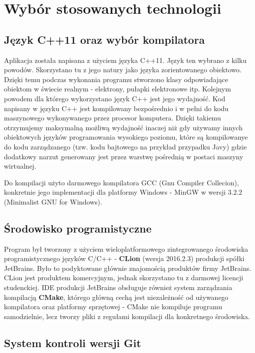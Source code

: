\chapter{Wybór stosowanych technologii}
\section{Język C++11 oraz wybór kompilatora}
Aplikacja została napisana z użyciem języka C++11. Język ten
wybrano z kilku powodów. Skorzystano tu z jego natury jako języka zorientowanego obiektowo. Dzięki temu podczas wykonania programu stworzono klasy odpowiadające obiektom w świecie realnym - elektrony, pułapki elektronowe itp.
Kolejnym powodem dla którego wykorzystano język C++ jest jego wydajność. Kod napisany
w języku C++ jest kompilowany bezpośrednio i w pełni do kodu maszynowego  wykonywanego przez procesor komputera. Dzięki takiemu
otrzymujemy maksymalną możliwą wydajność inaczej niż gdy używamy innych
obiektowych języków programowania wysokiego poziomu, które są kompilowanye do kodu
zarządzanego (tzw. kodu bajtowego na przykład przypadku Javy) gdzie dodatkowy narzut
generowany jest przez warstwę pośrednią w postaci maszyny wirtualnej. 

Do kompilacji użyto darmowego kompilatora GCC (Gnu Compiler Collecion), konkretnie jego implementacji dla platformy Windows - MinGW w wersji 3.2.2 (Minimalist GNU for Windows).

\section{Środowisko programistyczne}

Program był tworzony z użyciem wieloplatformowego zintegrowanego środowiska programistycznego języków C/C++ - \textbf{CLion} (wersja 2016.2.3) produkcji spółki JetBrains. Było to podyktowane głównie znajomością produktów firmy JetBrains. CLion jest produktem komercyjnym, jednak skorzystano tu z darmowej licencji studenckiej. IDE produkcji JetBrains obsługuje również 	system zarządzania kompilacją \textbf{CMake}, którego główną cechą jest niezależność od używanego kompilatora oraz platformy sprzętowej - CMake nie kompiluje programu samodzielnie, lecz tworzy pliki z regułami kompilacji dla konkretnego środowiska.

\section{System kontroli wersji Git}

